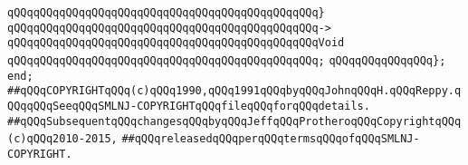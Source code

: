 \verb|qQQqqQQqqQQqqQQqqQQqqQQqqQQqqQQqqQQqqQQqqQQqqQQq}|\newline
\verb|qQQqqQQqqQQqqQQqqQQqqQQqqQQqqQQqqQQqqQQqqQQqqQQq->|\newline
\verb|qQQqqQQqqQQqqQQqqQQqqQQqqQQqqQQqqQQqqQQqqQQqqQQqVoid|\newline
\verb|qQQqqQQqqQQqqQQqqQQqqQQqqQQqqQQqqQQqqQQqqQQqqQQq;|\newline
\verb|qQQqqQQqqQQqqQQq};|\newline
\newline
\verb|end;|\newline
\newline
\verb|##qQQqCOPYRIGHTqQQq(c)qQQq1990,qQQq1991qQQqbyqQQqJohnqQQqH.qQQqReppy.qQQqqQQqSeeqQQqSMLNJ-COPYRIGHTqQQqfileqQQqforqQQqdetails.|\newline
\verb|##qQQqSubsequentqQQqchangesqQQqbyqQQqJeffqQQqProtheroqQQqCopyrightqQQq(c)qQQq2010-2015,|\newline
\verb|##qQQqreleasedqQQqperqQQqtermsqQQqofqQQqSMLNJ-COPYRIGHT.|\newline


